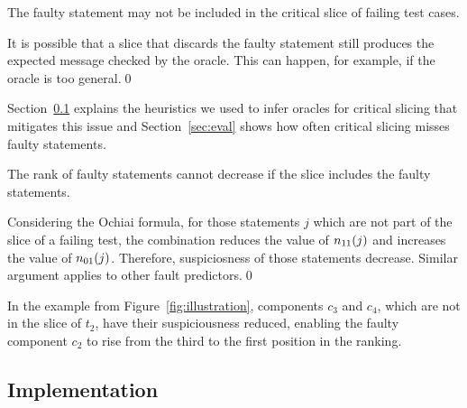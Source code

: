 \documentclass[sigplan,10pt,review,anonymous]{acmart}\settopmatter{printfolios=true,printccs=false,printacmref=false}
\begin{document}
\begin{theorem}
  The faulty statement may not be included in the critical slice of
  failing test cases.
\end{theorem}

It is possible that a slice that discards the faulty statement still
produces the expected message checked by the oracle. This can happen,
for example, if the oracle is too general.\qed

 Section~\ref{sec:impl} explains the heuristics
we used to infer oracles for critical slicing that mitigates this
issue and Section~\ref{sec:eval} shows how often critical slicing
misses faulty statements.

\begin{theorem}
  The rank of faulty statements cannot decrease if the slice includes
  the faulty statements.
\end{theorem}

Considering the Ochiai formula, for those statements $j$ which are not
part of the slice of a failing test, the combination reduces the value
of $n_{11}(j)$ and increases the value of $n_{01}(j)$. Therefore,
suspiciosness of those statements decrease. Similar argument applies
to other fault predictors.\qed{}

In the example from Figure~\ref{fig:illustration}, components $c_3$
and $c_4$, which are not in the slice of $t_2$, have their
suspiciousness reduced, enabling the faulty component $c_2$ to rise
from the third to the first position in the ranking.

\subsection{Implementation}
\label{sec:impl}

\end{document}
